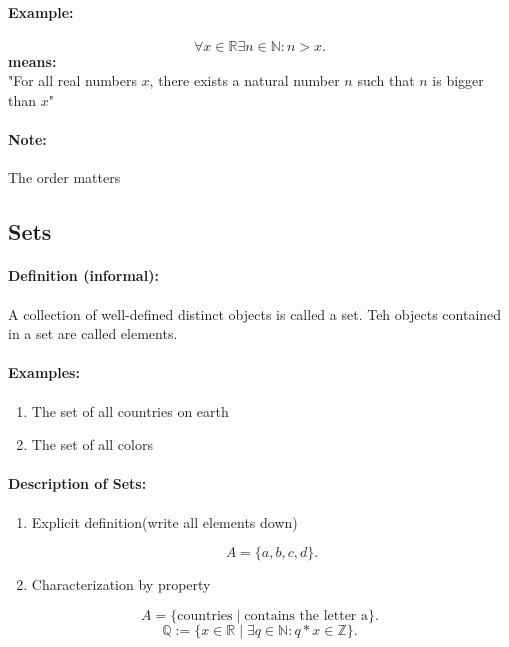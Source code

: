 \documentclass[twocolumn]{article}
\begin{document}
			\paragraph{Example:}
				\[
				\forall x\in\mathbb R\exists n\in\mathbb N:n>x
				.\]
				\textbf{means:}\\
				"For all real numbers $x$, there exists a natural number
				$n$ such that $n$ is bigger than $x$" 
			\paragraph{Note:}
				The order matters

	\subsection{Sets}
			\paragraph{Definition (informal):}
				A collection of well-defined distinct objects is called a set.
				Teh objects contained in a set are called elements.
			\paragraph{Examples:}
				\begin{enumerate}
				\item The set of all countries on earth
				\item The set of all colors
				\end{enumerate}
			\paragraph{Description of Sets:}
				\begin{enumerate}
				\item Explicit definition(write all elements down)

					\[
					A=\{a,b,c,d\}
					.\]  
				\item Characterization by property
				\end{enumerate}
					\[
					A=\{\mbox{countries}\mid\mbox{contains the letter a}\}
					.\] 
					\[
					\mathbb Q:=\{x\in\mathbb R\mid\exists q\in\mathbb N
					:q*x\in\mathbb Z\} 
					.\] 
\end{document}
